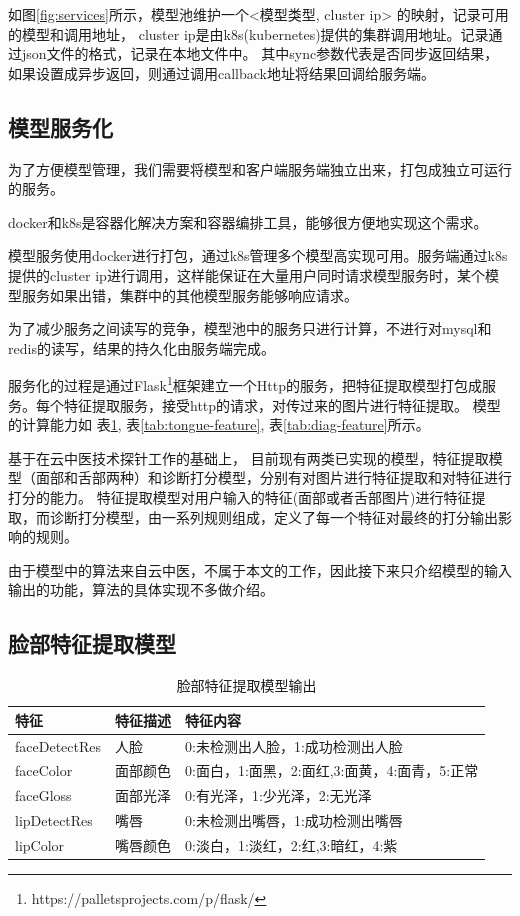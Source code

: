 如图\ref{fig:services}所示，模型池维护一个<模型类型, cluster ip> 的映射，记录可用的模型和调用地址， cluster ip是由k8s(kubernetes)提供的集群调用地址。记录通过json文件的格式，记录在本地文件中。
其中sync参数代表是否同步返回结果，如果设置成异步返回，则通过调用callback地址将结果回调给服务端。


\subsection{模型服务化}
为了方便模型管理，我们需要将模型和客户端服务端独立出来，打包成独立可运行的服务。

docker和k8s是容器化解决方案和容器编排工具，能够很方便地实现这个需求。

模型服务使用docker进行打包，通过k8s管理多个模型高实现可用。服务端通过k8s提供的cluster ip进行调用，这样能保证在大量用户同时请求模型服务时，某个模型服务如果出错，集群中的其他模型服务能够响应请求。

为了减少服务之间读写的竞争，模型池中的服务只进行计算，不进行对mysql和redis的读写，结果的持久化由服务端完成。

服务化的过程是通过Flask\footnote{https://palletsprojects.com/p/flask/}框架建立一个Http的服务，把特征提取模型打包成服务。每个特征提取服务，接受http的请求，对传过来的图片进行特征提取。
模型的计算能力如 表\ref{tab:face-feature}, 表\ref{tab:tongue-feature}, 表\ref{tab:diag-feature}所示。

基于在云中医技术探针工作的基础上， 目前现有两类已实现的模型，特征提取模型（面部和舌部两种）和诊断打分模型，分别有对图片进行特征提取和对特征进行打分的能力。
特征提取模型对用户输入的特征(面部或者舌部图片)进行特征提取，而诊断打分模型，由一系列规则组成，定义了每一个特征对最终的打分输出影响的规则。

由于模型中的算法来自云中医，不属于本文的工作，因此接下来只介绍模型的输入输出的功能，算法的具体实现不多做介绍。




\subsection{脸部特征提取模型}

\begin{table}[]
    \centering
    \begin{tabular}{lll}
        \toprule
        特征          & 特征描述     & 特征内容 \\ 
        \midrule
        faceDetectRes & 人脸   & 0:未检测出人脸，1:成功检测出人脸  \\
        faceColor     & 面部颜色 & 0:面白，1:面黑，2:面红,3:面黄，4:面青，5:正常 \\
        faceGloss     & 面部光泽 & 0:有光泽，1:少光泽，2:无光泽\\
        lipDetectRes  & 嘴唇   & 0:未检测出嘴唇，1:成功检测出嘴唇\\
        lipColor      & 嘴唇颜色 & 0:淡白，1:淡红，2:红,3:暗红，4:紫   \\
        \bottomrule
    \end{tabular}
    \caption{脸部特征提取模型输出}
    \label{tab:face-feature}
\end{table}

